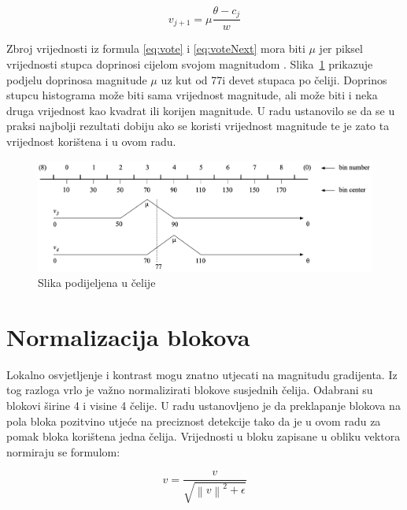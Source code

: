 \documentclass[times, utf8, zavrsni]{fer}
\begin{document}
 \begin{equation}
 	v_{j+1} = \mu \frac{\theta - c_j}{w}
 	\label{eq:voteNext}
\end{equation}

Zbroj vrijednosti iz formula \ref{eq:vote} i \ref{eq:voteNext} mora biti \(\mu\) jer piksel vrijednosti stupca doprinosi cijelom svojom magnitudom \citep{tomasi2012histograms}. Slika~\ref{fig:vote} prikazuje podjelu doprinosa magnitude \(\mu \) uz kut od 77\degree i devet stupaca po čeliji. Doprinos stupcu histograma može biti sama vrijednost magnitude, ali može biti i neka druga vrijednost kao kvadrat ili korijen magnitude. U radu \cite{dalal2005histograms} ustanovilo se da se u praksi najbolji rezultati dobiju ako se koristi vrijednost magnitude te je zato ta vrijednost korištena i u ovom radu.

\begin{figure}[htb]
	\centering
	\includegraphics[width=\linewidth]{figures/vote.png}
	\caption{Slika podijeljena u čelije\protect\footnotemark}
	\label{fig:vote}
\end{figure}


\section{Normalizacija blokova}
Lokalno osvjetljenje i kontrast mogu znatno utjecati na magnitudu gradijenta. Iz tog razloga vrlo je važno normalizirati blokove susjednih čelija. Odabrani su blokovi širine 4 i visine 4 čelije. U radu \cite{dalal2005histograms} ustanovljeno je da preklapanje blokova na pola bloka pozitvino utjeće na preciznost detekcije tako da je u ovom radu za pomak bloka korištena jedna čelija. Vrijednosti u bloku zapisane u obliku vektora normiraju se formulom:

\begin{equation}
	v = \frac{v}{\sqrt{\left\|v\right\|^2 + \epsilon}}
	\label{eq:norm}
\end{equation}
\end{document}
